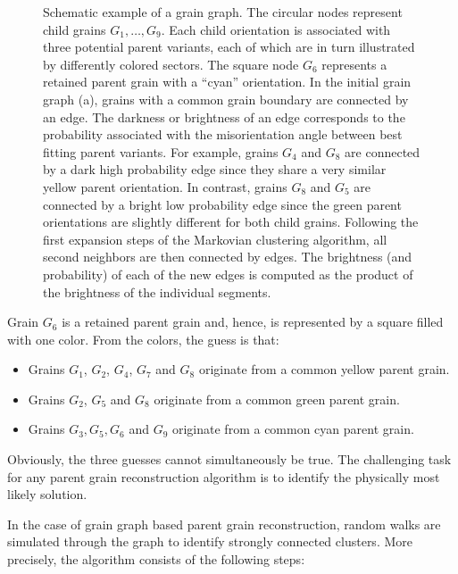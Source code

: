 \documentclass{elsarticle}
\numberwithin{equation}{section}
\begin{document}
\begin{figure}
    \centering
    \caption{Schematic example of a grain graph. The circular nodes represent child grains $G_1,\ldots,G_9$. Each child orientation is associated with three potential parent variants, each of which are in turn illustrated by differently colored sectors. The square node $G_6$ represents a retained parent grain with a ``cyan'' orientation. 
    In the initial grain graph (a), grains with a common grain boundary are connected by an edge. The darkness or brightness of an edge corresponds to the probability associated with the misorientation angle between best fitting parent variants. For example, grains $G_4$ and $G_8$ are connected by a dark high probability edge since they share a very similar yellow parent orientation. In contrast, grains $G_8$ and $G_5$ are connected by a bright low probability edge since the green parent orientations are slightly different for both child grains.
    Following the first expansion steps of the Markovian clustering algorithm, all second neighbors are then connected by edges. The brightness (and probability) of each of the new edges is computed as the product of the brightness of the individual segments.}
\end{figure}

Grain $G_6$ is a retained parent grain and, hence, is represented by a square filled with one color. From the colors, the guess is that:

\begin{itemize}
    \item Grains $G_1$, $G_2$, $G_4$, $G_7$ and $G_8$ originate from a common yellow parent grain.
    \item Grains $G_2$, $G_5$ and $G_8$ originate from a common green parent grain.
    \item Grains $G_3, G_5, G_6$ and $G_9$ originate from a common cyan parent grain.
\end{itemize}

Obviously, the three guesses cannot simultaneously be true. The challenging task for any parent grain reconstruction algorithm is to identify the physically most likely solution.

In the case of grain graph based parent grain reconstruction, random walks are simulated through the graph to identify strongly connected clusters. More precisely, the algorithm consists of the following steps:
\end{document}
